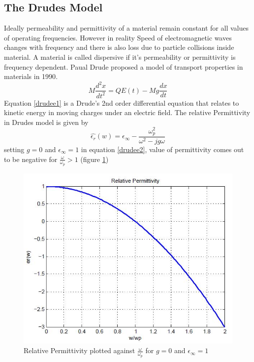 \subsection{The Drudes Model}
Ideally permeability and permittivity of a material remain constant for all values of operating frequencies. However in reality Speed of electromagnetic waves changes with frequency and there is also loss due to particle collisions inside material. A material is called dispersive if it's permeability or permittivity is frequency dependent.
Paual Drude proposed a model of transport properties in materials in 1990\citep{drude}.
\begin{equation}
	M\frac{d^2x}{dt^2} = QE(t) - Mg\frac{dx}{dt}
\label{drudee1}
\end{equation}
Equation \eqref{drudee1} is a Drude's 2nd order differential equation that relates to kinetic energy in moving charges under an electric field. The relative Permittivity in Drudes model is given by 
\begin{equation}
\hat{\epsilon_r} (w) = \epsilon_{\infty}- \frac{\omega_p^2}{\omega^2 - jg\omega}
\label{drudee2}
\end{equation}
setting $g=0$ and $ \epsilon_{\infty} = 1$ in equation \eqref{drudee2}, value of permittivity comes out to be negative for $\frac{\omega}{\omega_p} > 1$ (figure \ref{drude1})
\begin{figure}[htbp]
	\centering
		\includegraphics[width=5in]{Figures/drude1.jpg}
	\caption[Permittivity in Drudes model for different frequencies]{Relative Permittivity plotted against $\frac{\omega}{\omega_p}$ for $g=0$ and $ \epsilon_{\infty} = 1$ }
	\label{drude1}
\end{figure}

